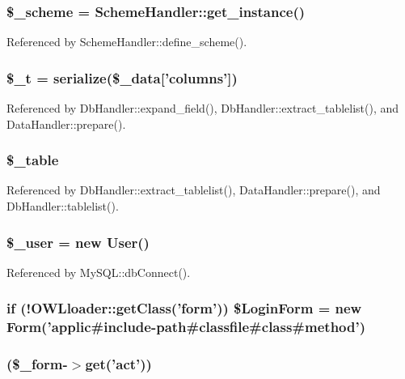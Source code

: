 \subsubsection[{\$\_\-scheme}]{\setlength{\rightskip}{0pt plus 5cm}\$\_\-scheme = SchemeHandler::get\_\-instance()}\label{index_8php_abb5321c25f21f089f5c253d5f2697502}


Referenced by SchemeHandler::define\_\-scheme().

\subsubsection[{\$\_\-t}]{\setlength{\rightskip}{0pt plus 5cm}\$\_\-t = serialize(\$\_\-data\mbox{[}'columns'\mbox{]})}\label{index_8php_a7a22c26026cc0626b015085e752b45cb}


Referenced by DbHandler::expand\_\-field(), DbHandler::extract\_\-tablelist(), and DataHandler::prepare().

\subsubsection[{\$\_\-table}]{\setlength{\rightskip}{0pt plus 5cm}\$\_\-table}\label{index_8php_ac0ee5b766d19cb282552a3449a1f8376}


Referenced by DbHandler::extract\_\-tablelist(), DataHandler::prepare(), and DbHandler::tablelist().

\subsubsection[{\$\_\-user}]{\setlength{\rightskip}{0pt plus 5cm}\$\_\-user = new {\bf User}()}\label{index_8php_a5df5982b9dadc74df05081972cd67fdf}


Referenced by MySQL::dbConnect().

\subsubsection[{\$LoginForm}]{\setlength{\rightskip}{0pt plus 5cm}if (!OWLloader::getClass('form')) \$LoginForm = new {\bf Form}('applic\#include-\/path\#classfile\#class\#method')}\label{index_8php_ae89d28a5f6ccd73a8cb4a0253db78766}
\subsubsection[{switch}]{(\$\_\-form-\/$>$get('act'))}\label{index_8php_aa284f7d5270c1aa684d885f7bb70d532}

